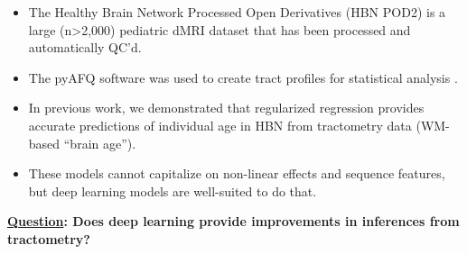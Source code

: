 \documentclass[a0paper,landscape,fontscale=0.365]{baposter}
\begin{document}
\begin{poster}
{\begin{itemize}[nosep, leftmargin=*]
\begin{multicols}{4}
        \vspace{2em}
    \end{multicols}

    \item The Healthy Brain Network Processed Open Derivatives (HBN POD2) is a
    large (n>2,000) pediatric dMRI dataset that has been processed and automatically QC'd\cite{RichieHalfordCieslak2022HBNPOD2, alexander2017hbn}.
    \item The pyAFQ software was used to create tract profiles for statistical analysis \cite{Kruper2021evaluating}.
    \item In previous work, we demonstrated that regularized regression provides accurate predictions of individual age in HBN from tractometry data (WM-based ``brain age'')\cite{richford2021sgl}.
    \item These models cannot capitalize on non-linear effects and sequence features, but deep learning models are well-suited to do that.
\end{itemize}

\vspace{0.5em}
\noindent\textbf{%
    \underline{Question}: %
    Does deep learning provide improvements in inferences from tractometry?%
}
\vspace{0.5em}}

\end{poster}
\end{document}
